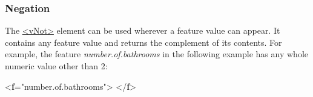 \subsubsection[{Negation}]{Negation}\label{FVNOT}\par
The \hyperref[TEI.vNot]{<vNot>} element can be used wherever a feature value can appear. It contains any feature value and returns the complement of its contents. For example, the feature \textit{number.of.bathrooms} in the following example has any whole numeric value other than 2: \par\bgroup{}\exampleFont \begin{shaded}\noindent\mbox{}{<\textbf{f}\hspace*{1em}{name}="{number.of.bathrooms}">}\mbox{}\newline 
{}\mbox{}\newline 
\hspace*{1em}\mbox{}\newline 
{}\mbox{}\newline 
{</\textbf{f}>}\end{shaded}\egroup\par \par
